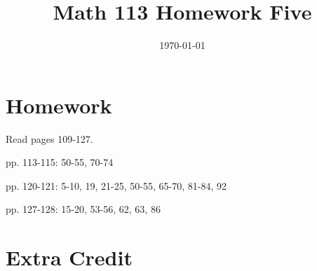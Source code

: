 \documentclass[fleqn,addpoints]{exam}
\title{Math 113 Homework Five}
\author{}
\date{\today}
\begin{document}
\maketitle

\section{Homework}

\begin{itemize*}
\item Read pages 109-127.
\item pp. 113-115: 50-55, 70-74
\item pp. 120-121: 5-10, 19, 21-25, 50-55, 65-70, 81-84, 92
\item pp. 127-128: 15-20, 53-56, 62, 63, 86
\end{itemize*}

\section{Extra Credit}
\end{document}
